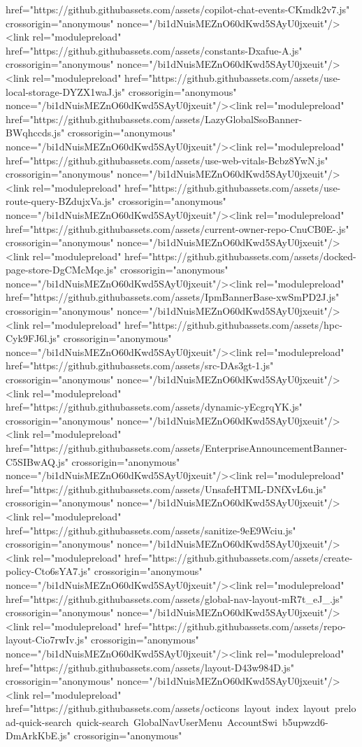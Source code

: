 href="https://github.githubassets.com/assets/copilot-chat-events-CKmdk2v7.js" crossorigin="anonymous" nonce="/bi1dNuisMEZnO60dKwd5SAyU0jxeuit"/><link rel="modulepreload" href="https://github.githubassets.com/assets/constants-Dxafue-A.js" crossorigin="anonymous" nonce="/bi1dNuisMEZnO60dKwd5SAyU0jxeuit"/><link rel="modulepreload" href="https://github.githubassets.com/assets/use-local-storage-DYZX1waJ.js" crossorigin="anonymous" nonce="/bi1dNuisMEZnO60dKwd5SAyU0jxeuit"/><link rel="modulepreload" href="https://github.githubassets.com/assets/LazyGlobalSsoBanner-BWqhccds.js" crossorigin="anonymous" nonce="/bi1dNuisMEZnO60dKwd5SAyU0jxeuit"/><link rel="modulepreload" href="https://github.githubassets.com/assets/use-web-vitals-Bcbz8YwN.js" crossorigin="anonymous" nonce="/bi1dNuisMEZnO60dKwd5SAyU0jxeuit"/><link rel="modulepreload" href="https://github.githubassets.com/assets/use-route-query-BZdujxVa.js" crossorigin="anonymous" nonce="/bi1dNuisMEZnO60dKwd5SAyU0jxeuit"/><link rel="modulepreload" href="https://github.githubassets.com/assets/current-owner-repo-CnuCB0E-.js" crossorigin="anonymous" nonce="/bi1dNuisMEZnO60dKwd5SAyU0jxeuit"/><link rel="modulepreload" href="https://github.githubassets.com/assets/docked-page-store-DgCMcMqe.js" crossorigin="anonymous" nonce="/bi1dNuisMEZnO60dKwd5SAyU0jxeuit"/><link rel="modulepreload" href="https://github.githubassets.com/assets/IpmBannerBase-xwSmPD2J.js" crossorigin="anonymous" nonce="/bi1dNuisMEZnO60dKwd5SAyU0jxeuit"/><link rel="modulepreload" href="https://github.githubassets.com/assets/hpc-Cyk9FJ6l.js" crossorigin="anonymous" nonce="/bi1dNuisMEZnO60dKwd5SAyU0jxeuit"/><link rel="modulepreload" href="https://github.githubassets.com/assets/src-DAs3gt-1.js" crossorigin="anonymous" nonce="/bi1dNuisMEZnO60dKwd5SAyU0jxeuit"/><link rel="modulepreload" href="https://github.githubassets.com/assets/dynamic-yEcgrqYK.js" crossorigin="anonymous" nonce="/bi1dNuisMEZnO60dKwd5SAyU0jxeuit"/><link rel="modulepreload" href="https://github.githubassets.com/assets/EnterpriseAnnouncementBanner-C5SIBwAQ.js" crossorigin="anonymous" nonce="/bi1dNuisMEZnO60dKwd5SAyU0jxeuit"/><link rel="modulepreload" href="https://github.githubassets.com/assets/UnsafeHTML-DNfXvL6u.js" crossorigin="anonymous" nonce="/bi1dNuisMEZnO60dKwd5SAyU0jxeuit"/><link rel="modulepreload" href="https://github.githubassets.com/assets/sanitize-9eE9Wciu.js" crossorigin="anonymous" nonce="/bi1dNuisMEZnO60dKwd5SAyU0jxeuit"/><link rel="modulepreload" href="https://github.githubassets.com/assets/create-policy-Cto6sYA7.js" crossorigin="anonymous" nonce="/bi1dNuisMEZnO60dKwd5SAyU0jxeuit"/><link rel="modulepreload" href="https://github.githubassets.com/assets/global-nav-layout-mR7t_eJ_.js" crossorigin="anonymous" nonce="/bi1dNuisMEZnO60dKwd5SAyU0jxeuit"/><link rel="modulepreload" href="https://github.githubassets.com/assets/repo-layout-Cio7rwIv.js" crossorigin="anonymous" nonce="/bi1dNuisMEZnO60dKwd5SAyU0jxeuit"/><link rel="modulepreload" href="https://github.githubassets.com/assets/layout-D43w984D.js" crossorigin="anonymous" nonce="/bi1dNuisMEZnO60dKwd5SAyU0jxeuit"/><link rel="modulepreload" href="https://github.githubassets.com/assets/octicons~layout~index~layout~preload-quick-search~quick-search~GlobalNavUserMenu~AccountSwi~b5upwzd6-DmArkKbE.js" crossorigin="anonymous" 